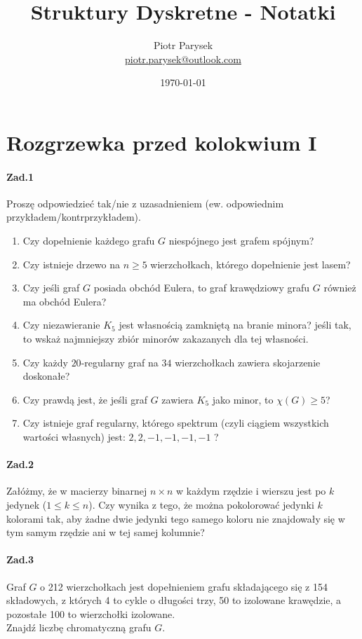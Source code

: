 \documentclass[a4paper,12pt]{article}
\title{Struktury Dyskretne - Notatki}
\author{Piotr Parysek\\
\href{mailto:piotr.parysek@outlook.com}{piotr.parysek@outlook.com} }
\date{\today}
\theoremstyle{definition}%
\theoremstyle{definition}
\theoremstyle{problem}
\begin{document}
\maketitle

\tableofcontents

\section{Rozgrzewka przed kolokwium I}
\paragraph{Zad.1}
Proszę odpowiedzieć tak/nie z uzasadnieniem (ew. odpowiednim przykładem/kontrprzykładem).
\begin{enumerate}[label=\alph*)]
\item Czy dopełnienie każdego grafu $G$ niespójnego jest grafem spójnym?
\item Czy istnieje drzewo na $n \geq 5$ wierzchołkach, którego dopełnienie jest lasem?
\item  Czy jeśli graf $G$ posiada obchód Eulera, to graf krawędziowy grafu $G$ również ma obchód Eulera?
\item Czy niezawieranie $K_5$ jest własnością zamkniętą na branie minora? jeśli tak, to wskaż najmniejszy zbiór minorów zakazanych dla tej własności.
\item  Czy każdy $20$-regularny graf na $34$ wierzchołkach zawiera skojarzenie doskonałe?
\item Czy prawdą jest, że jeśli graf $G$ zawiera $K_5$ jako minor, to $\chi(G) \geq 5$?
\item  Czy istnieje graf regularny, którego spektrum (czyli ciągiem wszystkich wartości własnych) jest: $2, 2, -1, -1, -1, -1$ ?
\end{enumerate}


\paragraph{Zad.2} Załóżmy, że w macierzy binarnej $n\times n$ w każdym rzędzie i wierszu jest po $k$ jedynek ($1 \leq k \leq n$). Czy wynika z tego, że można pokolorować jedynki $k$ kolorami tak, aby żadne dwie jedynki tego samego koloru nie znajdowały się w tym samym rzędzie ani w tej samej kolumnie?

\paragraph{Zad.3} Graf $G$ o 212 wierzchołkach jest dopełnieniem grafu składającego się z 154 składowych, z których 4 to cykle o długości trzy, 50 to izolowane krawędzie, a pozostałe 100 to wierzchołki izolowane.\\
Znajdź liczbę chromatyczną grafu $G$.
\end{document}
